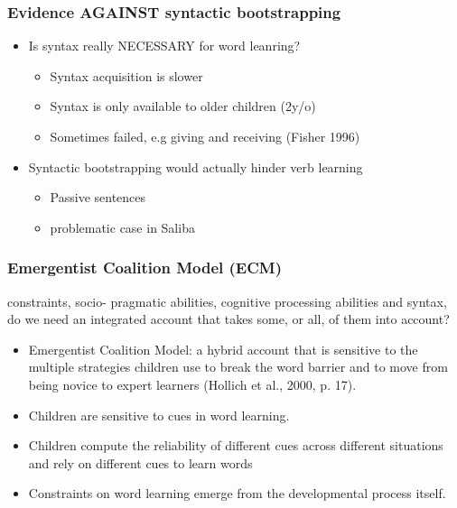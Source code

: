 \documentclass{beamer}
\begin{document}
\begin{frame}
\frametitle{Evidence AGAINST syntactic bootstrapping}
\begin{itemize}
    \item Is syntax really NECESSARY for word leanring?
    \begin{itemize}
        \item Syntax acquisition is slower
        \item Syntax is only available to older children (2y/o)
        \item Sometimes failed, e.g giving and receiving (Fisher 1996)
    \end{itemize}
    \pause
    \item Syntactic bootstrapping would actually hinder verb learning
    \begin{itemize}
        \item Passive sentences
        \item problematic case in Saliba
    \end{itemize}
\end{itemize}
\end{frame}
\begin{frame}
\frametitle{Emergentist Coalition Model (ECM)}
 constraints, socio- pragmatic abilities, cognitive processing abilities and syntax, do we need an integrated account that takes some, or all, of them into account?
\begin{itemize}
\item Emergentist Coalition Model: a hybrid account that is sensitive to the multiple strategies children use to break the word barrier and to move from being novice to expert learners (Hollich et al., 2000, p. 17).
\pause
\item Children are sensitive to cues in word learning.
\item Children compute the reliability of different cues across different situations and rely on different cues to learn words
\item Constraints on word learning emerge from the developmental process itself.
\end{itemize}
\end{frame}
\end{document}
